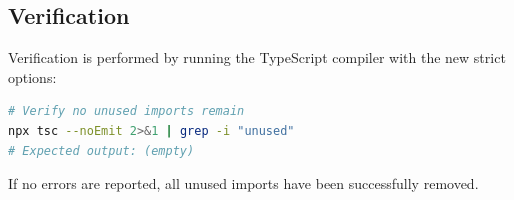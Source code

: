 \subsection*{Verification}
Verification is performed by running the TypeScript compiler with the new strict options:

\begin{lstlisting}[language=bash]
# Verify no unused imports remain
npx tsc --noEmit 2>&1 | grep -i "unused"
# Expected output: (empty)
\end{lstlisting}

If no errors are reported, all unused imports have been successfully removed.
